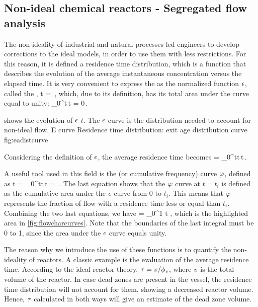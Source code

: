 \subsection{Non-ideal chemical reactors - Segregated flow analysis}
The non-ideality of industrial and natural processes led engineers to develop corrections to the ideal models, in order to use them with less restrictions. For this reason, it is defined a residence time distribution, which is a function that describes the evolution of the average instantaneous concentration versus the elapsed time. It is very convenient to express the  as the normalized function $\epsilon$, called the ,
\beq
\eadist\vat t = \,,
\eeq
which, due to its definition, has its total area under the curve equal to unity:
\beq
\int_0^\infty\eadist\vat t\,\dx t = 0\,.
\eeq

 shows the evolution of $\epsilon$ \vs $t$. The $\epsilon$ curve is the distribution needed to account for non-ideal flow.
%
   {E curve}
   {Residence time distribution: exit age distribution curve}%
   {fig:eadistcurve}%

Considering the definition of $\epsilon$, the average residence time becomes
\beq
\rtime = \int_0^\infty t\eadist\vat t\,\dx t\,.
\eeq

A useful tool used in this field is the  (or cumulative frequency) curve $\varphi$, defined as
\beq
\crtfrac\vat t = \int_0^\infty t\eadist\vat t\,\dx t 
               = \,.
\eeq
The last equation shows that the $\varphi$ curve at $t = t_i$ is defined as the cumulative area under the $\epsilon$ curve from 0 to $t_i$. This means that $\varphi$ represents the fraction of flow with a residence time less or equal than $t_i$. Combining the two last equations, we have
\beq
\rtime = \int_0^1 t\,\dx\crtfrac\,,
\eeq
which is the highlighted area in \cref{fig:flowcharcurves}. Note that the boundaries of the last integral must be 0 to 1, since the area under the $\epsilon$ curve equals unity.

The reason why we introduce the use of these functions is to quantify the non-ideality of reactors. A classic example is the evaluation of the average residence time. According to the ideal reactor theory, $\tau = v/\phi_{v}$, where $v$ is the total volume of the reactor. In case dead zones are present in the vessel, the residence time distribution will not account for them, showing a decreased reactor volume. Hence, $\tau$ calculated in both ways will give an estimate of the dead zone volume.


